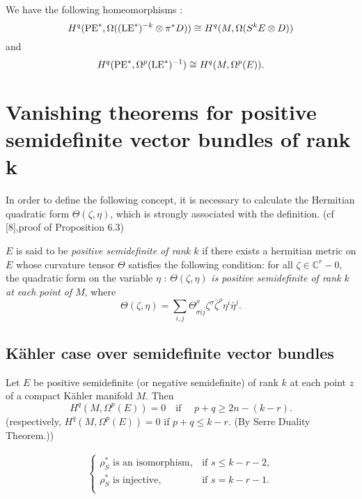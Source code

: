 \documentclass[lang=en,12pt]{beautybook}
\begin{document}
We have the following homeomorphisms \cite[Theorem 2.1, P504 and P502]{kobayashi1970complex}:
\[ H^q (\operatorname{PE}^{\ast}, \Omega ((\operatorname{LE}^{\ast})^{- k} \otimes \pi^{\ast}
   D)) \cong H^q (M, \Omega (S^k E \otimes D)) \]
and
\[ H^q (\operatorname{PE}^{\ast}, \Omega^p (\operatorname{LE}^{\ast})^{- 1}) \cong H^q (M,
   \Omega^p (E)) . \]

\section{Vanishing theorems for positive semidefinite vector bundles of rank
k}

In order to define the following concept, it is necessary to calculate the
Hermitian quadratic form $\Theta (\zeta, \eta)$, which is strongly associated
with the definition. (cf [8],proof of Proposition 6.3)

\begin{definition}
  $E$ is said to be {\emph{positive semidefinite of rank $k$}} if
  there exists a hermitian metric on $E$ whose curvature tensor $\Theta$
  satisfies the following condition: for all $\zeta \in \mathbb{C}^r - 0$, the
  quadratic form on the variable $\eta$ : $\Theta (\zeta, \eta)$
  {\emph{is positive semidefinite of rank $k$ at each point of $M$}}, where
  \[ \Theta (\zeta, \eta) = \sum_{i, j} \Theta_{\sigma i \bar{j}}^{\rho}
     \zeta^{\sigma} \bar{\zeta}^{\rho} \eta^i \bar{\eta}^j . \]
\end{definition}

\subsection{K\"ahler case over semidefinite vector bundles}

\begin{theorem}
  Let $E$ be positive semidefinite (or negative semidefinite) of rank $k$ at
  each point $z$ of a compact K{\"a}hler manifold $M$. Then
  \[ H^q (M, \Omega^p (E)) = 0 \quad \text{if } \quad p + q \geqslant 2 n - (k
     - r) . \]
  (respectively, $H^q (M, \Omega^p (E)) = 0$ if $p + q \leqslant k - r$. (By
  Serre Duality Theorem.))
\end{theorem}
\begin{theorem}
    \begin{align*}
        \begin{cases}
                    \rho_S^* \text{ is an isomorphism}, & \text{if } s\leqslant k-r-2,\\ 
                    \rho_S^* \text{ is injective}, & \text{if } s= k-r-1.\\ 
        \end{cases}
    \end{align*}
        
\end{theorem}
    
\end{document}
